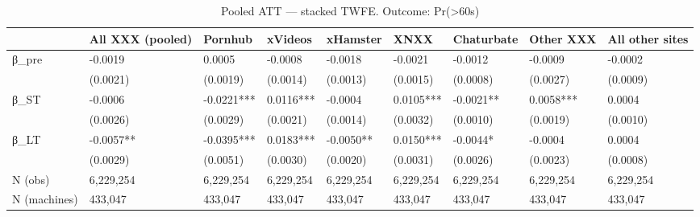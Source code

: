 \begin{table}

\caption{Pooled ATT — stacked TWFE. Outcome: Pr(>60s)}
\centering
\begin{tabular}[t]{lllllllll}
\toprule
  & All XXX (pooled) & Pornhub & xVideos & xHamster & XNXX & Chaturbate & Other XXX & All other sites\\
\midrule
β\_pre & -0.0019 & 0.0005 & -0.0008 & -0.0018 & -0.0021 & -0.0012 & -0.0009 & -0.0002\\
 & (0.0021) & (0.0019) & (0.0014) & (0.0013) & (0.0015) & (0.0008) & (0.0027) & (0.0009)\\
β\_ST & -0.0006 & -0.0221*** & 0.0116*** & -0.0004 & 0.0105*** & -0.0021** & 0.0058*** & 0.0004\\
 & (0.0026) & (0.0029) & (0.0021) & (0.0014) & (0.0032) & (0.0010) & (0.0019) & (0.0010)\\
β\_LT & -0.0057** & -0.0395*** & 0.0183*** & -0.0050** & 0.0150*** & -0.0044* & -0.0004 & 0.0004\\
\addlinespace
 & (0.0029) & (0.0051) & (0.0030) & (0.0020) & (0.0031) & (0.0026) & (0.0023) & (0.0008)\\
N (obs) & 6,229,254 & 6,229,254 & 6,229,254 & 6,229,254 & 6,229,254 & 6,229,254 & 6,229,254 & 6,229,254\\
N (machines) & 433,047 & 433,047 & 433,047 & 433,047 & 433,047 & 433,047 & 433,047 & 433,047\\
\bottomrule
\end{tabular}
\end{table}
